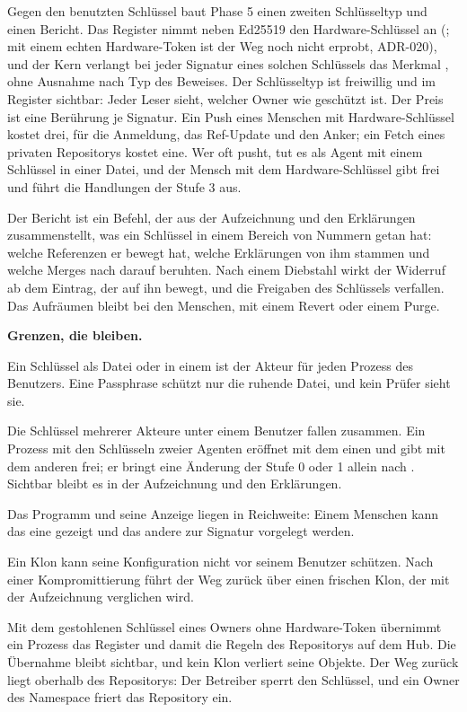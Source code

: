 Gegen den benutzten Schlüssel baut Phase 5 einen zweiten Schlüsseltyp und einen Bericht.
Das Register nimmt neben Ed25519 den Hardware-Schlüssel an
(; mit einem echten Hardware-Token ist der Weg noch nicht
erprobt, ADR-020), und der Kern verlangt bei jeder Signatur eines solchen
Schlüssels das Merkmal , ohne Ausnahme nach Typ des Beweises.
Der Schlüsseltyp ist freiwillig und im Register sichtbar: Jeder Leser sieht, welcher Owner wie
geschützt ist.
Der Preis ist eine Berührung je Signatur.
Ein Push eines Menschen mit Hardware-Schlüssel kostet drei, für die Anmeldung, das Ref-Update und
den Anker; ein Fetch eines privaten Repositorys kostet eine.
Wer oft pusht, tut es als Agent mit einem Schlüssel in einer Datei, und der Mensch mit dem
Hardware-Schlüssel gibt frei und führt die Handlungen der Stufe 3 aus.

Der Bericht ist ein Befehl, der aus der Aufzeichnung und den Erklärungen zusammenstellt, was ein
Schlüssel in einem Bereich von Nummern getan hat: welche Referenzen er bewegt hat, welche
Erklärungen von ihm stammen und welche Merges nach  darauf beruhten.
Nach einem Diebstahl wirkt der Widerruf ab dem Eintrag, der  auf ihn bewegt, und die
Freigaben des Schlüssels verfallen.
Das Aufräumen bleibt bei den Menschen, mit einem Revert oder einem Purge.

\startwarnbox
{\bf Grenzen, die bleiben.}
\startitemize[packed]
\item Ein Schlüssel als Datei oder in einem  ist der Akteur für jeden Prozess des
Benutzers.
Eine Passphrase schützt nur die ruhende Datei, und kein Prüfer sieht sie.
\item Die Schlüssel mehrerer Akteure unter einem Benutzer fallen zusammen.
Ein Prozess mit den Schlüsseln zweier Agenten eröffnet mit dem einen und gibt mit dem anderen
frei; er bringt eine Änderung der Stufe 0 oder 1 allein nach .
Sichtbar bleibt es in der Aufzeichnung und den Erklärungen.
\item Das Programm und seine Anzeige liegen in Reichweite: Einem Menschen kann das eine gezeigt
und das andere zur Signatur vorgelegt werden.
\item Ein Klon kann seine Konfiguration nicht vor seinem Benutzer schützen.
Nach einer Kompromittierung führt der Weg zurück über einen frischen Klon,
der mit der Aufzeichnung verglichen wird.
\item Mit dem gestohlenen Schlüssel eines Owners ohne Hardware-Token übernimmt ein Prozess das
Register und damit die Regeln des Repositorys auf dem Hub.
Die Übernahme bleibt sichtbar, und kein Klon verliert seine Objekte.
Der Weg zurück liegt oberhalb des Repositorys: Der Betreiber sperrt den Schlüssel, und ein Owner
des Namespace friert das Repository ein.
\stopitemize
\stopwarnbox

